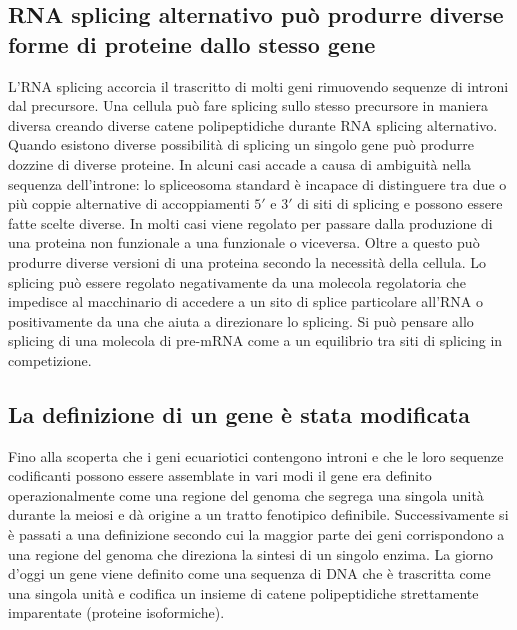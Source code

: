 \subsection{RNA splicing alternativo pu\`o produrre diverse forme di proteine dallo stesso gene}
L'RNA splicing accorcia il trascritto di molti geni rimuovendo sequenze di introni dal precursore. Una cellula pu\`o fare splicing sullo stesso precursore in maniera diversa creando 
diverse catene polipeptidiche durante RNA splicing alternativo. Quando esistono diverse possibilit\`a di splicing un singolo gene pu\`o produrre dozzine di diverse proteine. In alcuni
casi accade a causa di ambiguit\`a nella sequenza dell'introne: lo spliceosoma standard \`e incapace di distinguere tra due o pi\`u coppie alternative di accoppiamenti $5'$ e $3'$ di 
siti di splicing e possono essere fatte scelte diverse. In molti casi viene regolato per passare dalla produzione di una proteina non funzionale  a una funzionale o viceversa. Oltre a
questo pu\`o produrre diverse versioni di una proteina secondo la necessit\`a della cellula. Lo splicing pu\`o essere regolato negativamente da una molecola regolatoria che impedisce 
al macchinario di accedere a un sito di splice particolare all'RNA o positivamente da una che aiuta a direzionare lo splicing. Si pu\`o pensare allo splicing di una molecola di pre-mRNA
come a un equilibrio tra siti di splicing in competizione. 
\subsection{La definizione di un gene \`e stata modificata}
Fino alla scoperta che i geni ecuariotici contengono introni e che le loro sequenze codificanti possono essere assemblate in vari modi il gene era definito operazionalmente come una
regione del genoma che segrega una singola unit\`a durante la meiosi e d\`a origine a un tratto fenotipico definibile. Successivamente si \`e passati a una definizione secondo cui
la maggior parte dei geni corrispondono a una regione del genoma che direziona la sintesi di un singolo enzima. La giorno d'oggi un gene viene definito come una sequenza di DNA che \`e
trascritta come una singola unit\`a e codifica un insieme di catene polipeptidiche strettamente imparentate (proteine isoformiche). 
